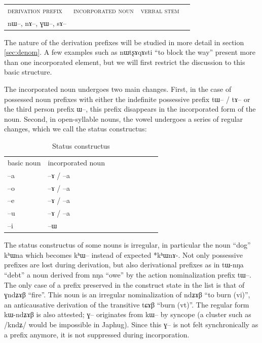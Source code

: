 \documentclass[oldfontcommands,oneside,a4paper,11pt]{article}
\newcommand{\ipa}[1]{{\phon #1}} %
\begin{document}
   \begin{tabular}{IIII}
\textsc{derivation prefix} & \textsc{incorporated noun} & \textsc{verbal stem} \\
\ipa{nɯ}--, \ipa{nɤ}--, \ipa{ɣɯ}--, \ipa{sɤ}-- && \\
\end{tabular}

The nature of the derivation prefixes will be studied in more detail in section \ref{sec:denom}.    A few examples such as \ipa{nɯtʂɤqɤsti} ``to block the way'' present more than one incorporated element, but we will first restrict the discussion to this basic structure.
 
The incorporated noun undergoes two main changes. First, in the case of possessed noun prefixes with either the indefinite possessive prefix \ipa{tɯ}-- / \ipa{tɤ}-- or the third person prefix \ipa{ɯ}--, this prefix disappears in the incorporated form of the noun. Second, in open-syllable nouns, the vowel undergoes a series of regular changes, which we call the \ipa{status constructus}:

\begin{table}[H] \centering
\caption{Status constructus}\label{tab:etatconstruit} 
\begin{tabular}{lllllllll} \toprule
basic noun  & incorporated noun &\\
 --\ipa{a} & --\ipa{ɤ} / --\ipa{a} \\
  --\ipa{o} & --\ipa{ɤ} / --\ipa{a} \\
    --\ipa{e} & --\ipa{ɤ} / --\ipa{a} \\
  --\ipa{u} & --\ipa{ɤ} / --\ipa{a} \\
   --\ipa{i} & --\ipa{ɯ} \\
    \bottomrule
\end{tabular}
\end{table}

The \ipa{status constructus} of some nouns is  irregular, in particular the noun ``dog'' \ipa{kʰɯna} which becomes \ipa{kʰɯ}-- instead of expected *kʰɯnɤ-. Not only possessive prefixes are lost during derivation, but also derivational prefixes as in \ipa{tɯ-nŋa} ``debt'' a noun derived from \ipa{nŋa} ``owe'' by the action nominalization prefix \ipa{tɯ}--. The only case of a prefix preserved in the construct state in the list is that of \ipa{ɣndʑɤβ} ``fire''. This noun is an irregular nominalization of \ipa{ndʑɤβ} ``to burn (vi)'', an anticausative derivation of the transitive \ipa{tɕɤβ} ``burn (vt)''. The regular form \ipa{kɯ-ndʑɤβ} is also attested; \ipa{ɣ}-- originates from \ipa{kɯ}-- by syncope (a cluster such as /kndʑ/ would be impossible in Japhug). Since this \ipa{ɣ}--  is not felt synchronically as a prefix anymore, it is not suppressed during incorporation.
\end{document}
